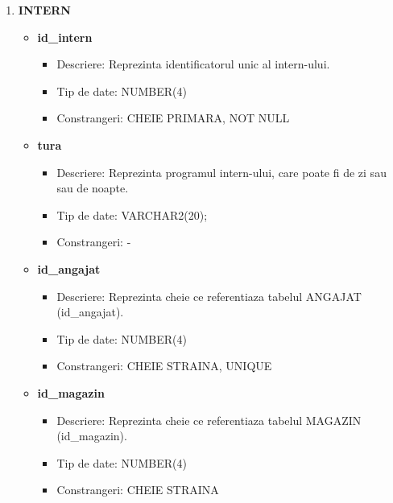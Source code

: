 \begin{enumerate}
\begin{itemize}
    \end{itemize}

    \vspace{0.5cm}

    \item \textbf{INTERN}
    \begin{itemize}
    
        \item \textbf{id\_intern}
                \begin{itemize}
                    \item Descriere: Reprezinta identificatorul unic al intern-ului.
                    \item Tip de date: NUMBER(4)
                    \item Constrangeri: CHEIE PRIMARA, NOT NULL
                \end{itemize}

        \item \textbf{tura}
                \begin{itemize}
                    \item Descriere: Reprezinta programul intern-ului, care poate fi de zi sau sau de noapte.
                    \item Tip de date: VARCHAR2(20);
                    \item Constrangeri: -
                \end{itemize}
                
       \item \textbf{id\_angajat}
                \begin{itemize}
                    \item Descriere: Reprezinta cheie ce referentiaza tabelul ANGAJAT (id\_angajat).
                    \item Tip de date: NUMBER(4)
                    \item Constrangeri: CHEIE STRAINA, UNIQUE
                \end{itemize}

        \item \textbf{id\_magazin}
                \begin{itemize}
                    \item Descriere: Reprezinta cheie ce referentiaza tabelul MAGAZIN (id\_magazin).
                    \item Tip de date: NUMBER(4)
                    \item Constrangeri: CHEIE STRAINA
                \end{itemize}

    \end{itemize}
    
\end{enumerate}
